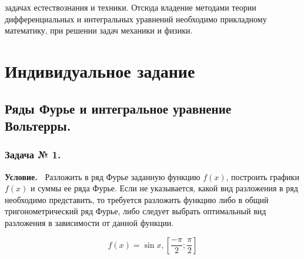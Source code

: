 \documentclass[12pt]{article}
\begin{document}
задачах естествознания и техники. Отсюда владение методами теории 
дифференциальных и интегральных уравнений необходимо прикладному математику, при решении задач 
механики и физики. 

\newpage 
\section{Индивидуальное задание} 


\subsection{Ряды Фурье и интегральное уравнение Вольтерры.} 
% 


\subsubsection*{\center Задача № 1.} 
{\bf Условие.~} 
Разложить в ряд Фурье заданную функцию $f(x)$, построить графики $f(x)$ и суммы ее ряда Фурье. Если не указывается, какой вид разложения в ряд необходимо представить, то требуется разложить функцию либо в общий тригонометрический ряд Фурье, либо следует выбрать оптимальный вид разложения в зависимости от данной функции. 


\begin{equation} 
f(x) = \sin{x}, \left[\frac{-\pi}{2};\frac{\pi}{2}\right]
\end{equation} 
\end{document}
